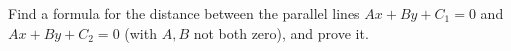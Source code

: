 Find a formula for the distance between the parallel lines $Ax+By+C_1=0$ and $Ax+By+C_2=0$ (with $A,B$ not both zero), and prove it.
